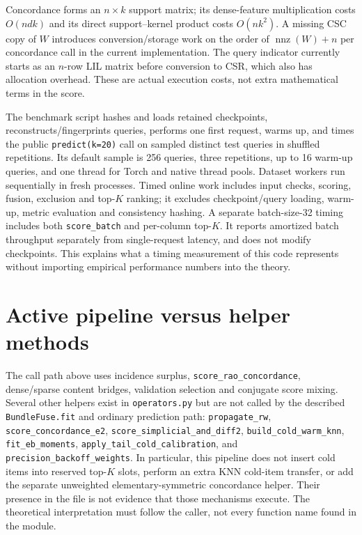 \documentclass[11pt,a4paper]{article}
\newcommand{\code}[1]{\nolinkurl{#1}}
\newcommand{\nnz}{\operatorname{nnz}}
\numberwithin{equation}{section}
\begin{document}
Concordance forms an $n\times k$ support matrix; its dense-feature multiplication costs
$O(ndk)$ and its direct support--kernel product costs $O(nk^2)$. A missing CSC copy of
$W$ introduces conversion/storage work on the order of $\nnz(W)+n$ per concordance call
in the current implementation. The query indicator currently starts as an $n$-row LIL
matrix before conversion to CSR, which also has allocation overhead. These are actual
execution costs, not extra mathematical terms in the score.

The benchmark script hashes and loads retained checkpoints, reconstructs/fingerprints
queries, performs one first request, warms up, and times the public \code{predict(k=20)}
call on sampled distinct test queries in shuffled repetitions. Its default sample is 256
queries, three repetitions, up to 16 warm-up queries, and one thread for Torch and native
thread pools. Dataset workers run sequentially in fresh processes. Timed online work
includes input checks, scoring, fusion, exclusion and top-$K$ ranking; it excludes
checkpoint/query loading, warm-up, metric evaluation and consistency hashing. A separate
batch-size-32 timing includes both \code{score_batch} and per-column top-$K$. It reports
amortized batch throughput separately from single-request latency, and does not modify
checkpoints. This explains what a timing measurement of this code represents without
importing empirical performance numbers into the theory.

\section{Active pipeline versus helper methods}\label{app:inactive}
The call path above uses incidence surplus, \code{score_rao_concordance}, dense/sparse
content bridges, validation selection and conjugate score mixing. Several other helpers
exist in \code{operators.py} but are not called by the described \code{BundleFuse.fit}
and ordinary prediction path: \code{propagate_rw}, \code{score_concordance_e2},
\code{score_simplicial_and_diff2}, \code{build_cold_warm_knn},
\code{fit_eb_moments}, \code{apply_tail_cold_calibration}, and
\code{precision_backoff_weights}. In particular, this pipeline does not insert cold items
into reserved top-$K$ slots, perform an extra KNN cold-item transfer, or add the separate
unweighted elementary-symmetric concordance helper. Their presence in the file is not
evidence that those mechanisms execute. The theoretical interpretation must follow the
caller, not every function name found in the module.
\end{document}
